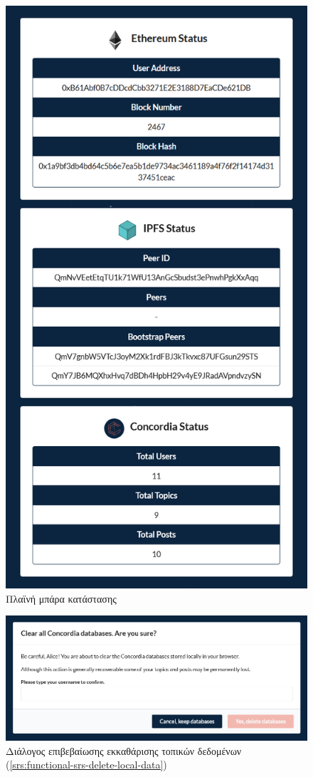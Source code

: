 \begin{figure}[H]
	\centering
	\includegraphics[width=.75\textwidth]{assets/figures/appendix-a/screenshot-10-status-sidebar}
	\caption{Πλαϊνή μπάρα κατάστασης}
\end{figure}

\begin{figure}[H]
	\centering
	\includegraphics[width=.9\textwidth]{assets/figures/appendix-a/screenshot-11-clear-databases-dialog}
	\caption{Διάλογος επιβεβαίωσης εκκαθάρισης τοπικών δεδομένων  (\ref{srs:functional-srs-delete-local-data})}
\end{figure}


